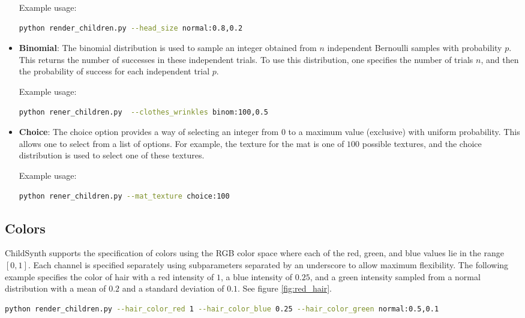 \documentclass{article}
\begin{document}
\begin{itemize}
    Example usage:
    \begin{lstlisting}[language=bash]
python render_children.py --head_size normal:0.8,0.2\end{lstlisting}
    
    \item \textbf{Binomial}: The binomial distribution is used to sample an integer obtained from $n$ independent Bernoulli samples with probability $p$. This returns the number of successes in these independent trials. To use this distribution, one specifies the number of trials $n$, and then the probability of success for each independent trial $p$. 
    
    Example usage:
    \begin{lstlisting}[language=bash]
python rener_children.py  --clothes_wrinkles binom:100,0.5\end{lstlisting}

    \item \textbf{Choice}: The choice option provides a way of selecting an integer from $0$ to a maximum value (exclusive) with uniform probability. This allows one to select from a list of options. For example, the texture for the mat is one of $100$ possible textures, and the choice distribution is used to select one of these textures.  
    
    Example usage:
    \begin{lstlisting}[language=bash]
python rener_children.py --mat_texture choice:100\end{lstlisting}
        
        
\end{itemize}

\subsection{Colors}
ChildSynth supports the specification of colors using the RGB color space where each of the red, green, and blue values lie in the range $[0,1]$. Each channel is specified separately using subparameters separated by an underscore to allow maximum flexibility. The following example specifies the color of hair with a red intensity of $1$, a blue intensity of $0.25$, and a green intensity sampled from a normal distribution with a mean of $0.2$ and a standard deviation of $0.1$. See figure \ref{fig:red_hair}.


\begin{lstlisting}[language=bash]
python render_children.py --hair_color_red 1 --hair_color_blue 0.25 --hair_color_green normal:0.5,0.1\end{lstlisting}
\end{document}
